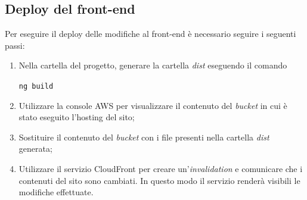 		
	\subsection{Deploy del front-end}
	Per eseguire il \gls{deploy} delle modifiche al front-end è necessario seguire i seguenti passi:
	\begin{enumerate}
		\item Nella cartella del progetto, generare la cartella \emph{dist} eseguendo il comando
		\begin{center}
			\texttt{ng build}
		\end{center}
		\item Utilizzare la console \gls{AWS} per visualizzare il contenuto del \emph{bucket} in cui è stato eseguito l'hosting del sito;
		\item Sostituire il contenuto del \emph{bucket} con i file presenti nella cartella \emph{dist} generata;
		\item Utilizzare il servizio \gls{CloudFront} per creare un'\emph{invalidation} e comunicare che i
		contenuti del sito sono cambiati. In questo modo il servizio renderà visibili le modifiche effettuate.
	\end{enumerate}